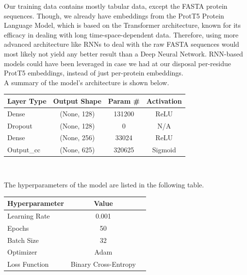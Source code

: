 \documentclass[10pt,twocolumn,letterpaper]{article}
\begin{document}
Our training data contains mostly tabular data, except the FASTA protein sequences. Though, we already have embeddings from the ProtT5 Protein Language Model, which is based on the Transformer architecture, known for its efficacy in dealing with long time-space-dependent data. Therefore, using more advanced architecture like RNNs to deal with the raw FASTA sequences would most likely not yield any better result than a Deep Neural Network. RNN-based models could have been leveraged in case we had at our disposal per-residue ProtT5 embeddings, instead of just per-protein embeddings. \\



A summary of the model's architecture is shown below.

\begin{center}
\begin{tabular}{lccc}
    \toprule
    Layer Type & Output Shape & Param \# & Activation\\
    \midrule
    Dense & (None, 128) & 131200 & ReLU\\
    Dropout & (None, 128) & 0 & N/A\\
    Dense &  (None, 256) & 33024 & ReLU \\
    Output\_cc & (None, 625) & 320625 & Sigmoid \\
    \bottomrule
\end{tabular} \\
\end{center}


The hyperparameters of the model are listed in the following table. \\

\begin{center}
\begin{tabular}{lcc}
    \toprule
    Hyperparameter & Value \\
    \midrule
    Learning Rate & 0.001 \\
    Epochs & 50 \\
    Batch Size & 32 \\
    Optimizer & Adam \\
    Loss Function & Binary Cross-Entropy\\
    \bottomrule
\end{tabular} \\
\end{center}
\end{document}
